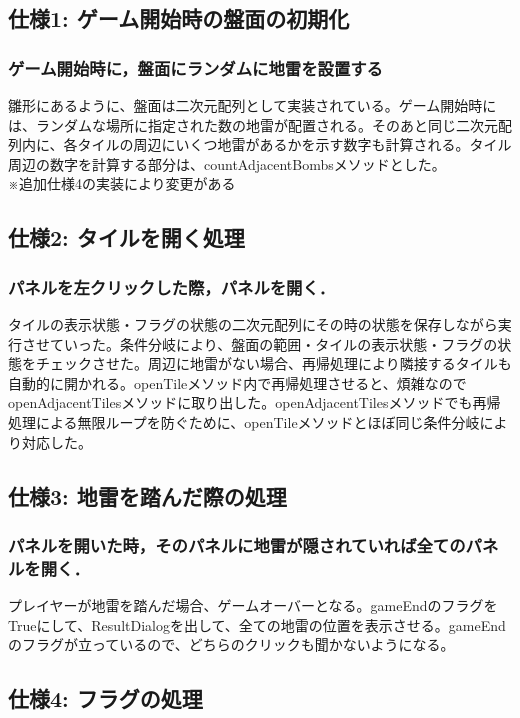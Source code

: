 \documentclass[a4j,12pt]{jsarticle}
\begin{document}
\subsection{仕様1: ゲーム開始時の盤面の初期化}
\subsubsection*{ゲーム開始時に，盤面にランダムに地雷を設置する}
雛形にあるように、盤面は二次元配列として実装されている。ゲーム開始時には、ランダムな場所に指定された数の地雷が配置される。そのあと同じ二次元配列内に、各タイルの周辺にいくつ地雷があるかを示す数字も計算される。タイル周辺の数字を計算する部分は、countAdjacentBombsメソッドとした。\\
※追加仕様4の実装により変更がある

\subsection{仕様2: タイルを開く処理}
\subsubsection*{パネルを左クリックした際，パネルを開く．}
タイルの表示状態・フラグの状態の二次元配列にその時の状態を保存しながら実行させていった。条件分岐により、盤面の範囲・タイルの表示状態・フラグの状態をチェックさせた。周辺に地雷がない場合、再帰処理により隣接するタイルも自動的に開かれる。openTileメソッド内で再帰処理させると、煩雑なのでopenAdjacentTilesメソッドに取り出した。openAdjacentTilesメソッドでも再帰処理による無限ループを防ぐために、openTileメソッドとほぼ同じ条件分岐により対応した。

\subsection{仕様3: 地雷を踏んだ際の処理}
\subsubsection*{パネルを開いた時，そのパネルに地雷が隠されていれば全てのパネルを開く．}
プレイヤーが地雷を踏んだ場合、ゲームオーバーとなる。gameEndのフラグをTrueにして、ResultDialogを出して、全ての地雷の位置を表示させる。gameEndのフラグが立っているので、どちらのクリックも聞かないようになる。

\subsection{仕様4: フラグの処理}
\end{document}
